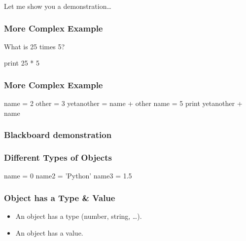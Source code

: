 \begin{frame}[fragile]

\bigskip
\bigskip
\bigskip
Let me show you a demonstration\ldots



\end{frame}

\begin{frame}[fragile]
\frametitle{More Complex Example}

What is 25 times 5?

\pause
\begin{python}
print 25 * 5
\end{python}
\end{frame}

\begin{frame}[fragile]
\frametitle{More Complex Example}

\begin{python}
name = 2
other = 3
yetanother = name + other
name = 5
print yetanother + name
\end{python}
\end{frame}

\begin{frame}[fragile]
\frametitle{Blackboard demonstration}

\end{frame}


\begin{frame}[fragile]
\frametitle{Different Types of Objects}

\begin{python}
name = 0
name2 = 'Python'
name3 = 1.5
\end{python}
\end{frame}


\begin{frame}[fragile]
\frametitle{Object has a Type \& Value}

\begin{itemize}
\item An object has a type (number, string, \ldots).
\item An object has a value.
\end{itemize}

\end{frame}

